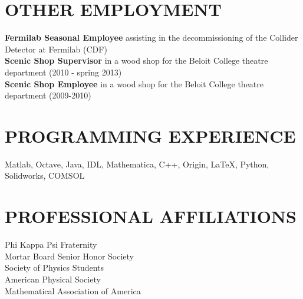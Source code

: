 \documentclass[11pt]{res}
\begin{document}
\begin{resume}
\section{OTHER EMPLOYMENT} 
\vspace{0.05in} 
    {\bf Fermilab Seasonal Employee} assisting in the decommissioning of the
	Collider Detector at Fermilab (CDF)\vspace{.05in}\\
    {\bf Scenic Shop Supervisor} in a wood shop for the Beloit College theatre
	department (2010 - spring 2013) \vspace{.05in}\\
    {\bf Scenic Shop Employee} in a wood shop for the Beloit College theatre department (2009-2010)\vspace{.05in}\\

	
 
\section{PROGRAMMING EXPERIENCE} 
\vspace{.05in}
Matlab, Octave, Java, IDL, Mathematica, C++,
Origin, \LaTeX, Python, Solidworks, COMSOL



\section{PROFESSIONAL AFFILIATIONS} 
\vspace{0.05in} 
    Phi Kappa Psi Fraternity \vspace{.01in}\\ 
    Mortar Board Senior Honor Society\vspace{.01in} \\
    Society of Physics Students \vspace{.01in}\\
   American Physical Society \vspace{.01in}\\
   Mathematical Association of America
   
	


\end{resume}
\end{document}
